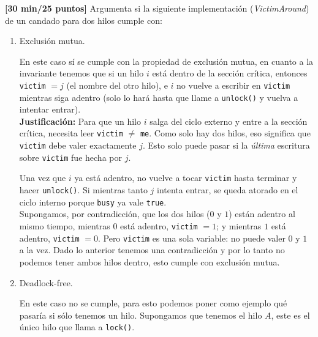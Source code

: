 \item[\textbf{2.}] \textbf{[30 min/25 puntos]} \textcolor{dkgreen}{Argumenta si la siguiente implementación (\textit{VictimAround}) de un candado para dos hilos cumple con:}

    \begin{enumerate}
        \item \textcolor{dkgreen}{Exclusión mutua.}

        En este caso sí se cumple con la propiedad de exclusión mutua, en cuanto a la invariante tenemos que si un hilo $i$ está dentro de la sección crítica, entonces \texttt{victim} $= j$ (el nombre del otro hilo), e $i$ no vuelve a escribir en \texttt{victim} mientras siga adentro (solo lo hará hasta que llame a \texttt{unlock()} y vuelva a intentar entrar).\\

        \textbf{Justificación:} Para que un hilo $i$ salga del ciclo externo y entre a la sección crítica, necesita leer \texttt{victim} $\neq$ \texttt{me}. Como solo hay dos hilos, eso significa que \texttt{victim} debe valer exactamente $j$. Esto solo puede pasar si la \emph{última} escritura sobre \texttt{victim} fue hecha por $j$.
        
        Una vez que $i$ ya está adentro, no vuelve a tocar \texttt{victim} hasta terminar y hacer \texttt{unlock()}. Si mientras tanto $j$ intenta entrar, se queda atorado en el ciclo interno porque \texttt{busy} ya vale \texttt{true}.\\
        
        Supongamos, por contradicción, que los dos hilos ($0$ y $1$) están adentro al mismo tiempo, mientras $0$ está adentro, \texttt{victim} $= 1$; y mientras $1$ está adentro, \texttt{victim} $= 0$. Pero \texttt{victim} es una sola variable: no puede valer $0$ y $1$ a la vez. Dado lo anterior tenemos una contradicción y por lo tanto no podemos tener ambos hilos dentro, esto cumple con exclusión mutua. 

        \item \textcolor{dkgreen}{Deadlock-free.}

        En este caso no se cumple, para esto podemos poner como ejemplo qué pasaría si sólo tenemos un hilo. Supongamos que tenemos el hilo $A$, este es el único hilo que llama a \texttt{lock()}.


\end{enumerate}
